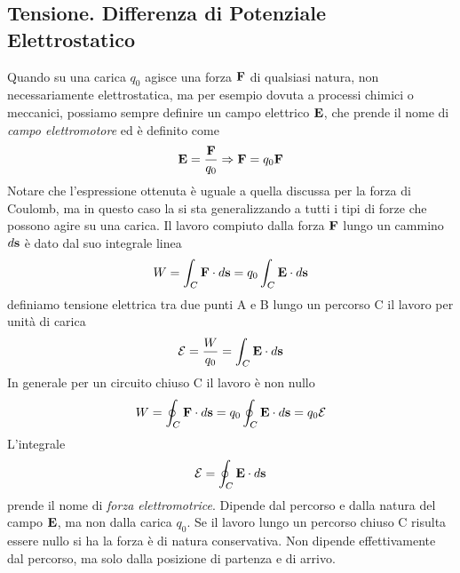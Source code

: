 \subsection{Tensione. Differenza di Potenziale Elettrostatico}
Quando su una carica $q_0$ agisce una forza $\bold{F}$ di qualsiasi natura, non necessariamente elettrostatica, ma per esempio dovuta a processi chimici o meccanici, possiamo sempre definire un campo elettrico $\bold{E}$, che prende il nome di \textit{campo elettromotore} ed \`e definito come
\begin{equation*}
	\bold{E} =  \frac{\bold{F}}{q_0} \Rightarrow \bold{F} = q_0 \bold{F}
\end{equation*}
 Notare che l'espressione ottenuta \`e uguale a quella discussa per la forza di Coulomb, ma in questo caso la si sta generalizzando a tutti i tipi di forze che possono agire su una carica. Il lavoro compiuto dalla forza $\bold{F}$ lungo un cammino $d \bold{s}$ \`e dato dal suo integrale linea 
 \begin{equation*}
 	W = \int_{C} \bold{F} \cdot d\bold{s} = q_0 \int_{C} \bold{E} \cdot d\bold{s}
 \end{equation*}
definiamo tensione elettrica tra due punti A e B lungo un percorso C il lavoro per unit\`a di carica  
\begin{equation*}
	\mathcal{E} = \frac{W}{q_0} = \int_{C}\bold{E} \cdot d\bold{s}
\end{equation*}
 In generale per un circuito chiuso C il lavoro \`e non nullo
\begin{equation*}
	W = \oint_{C} \bold{F} \cdot d\bold{s} = q_0 \oint_{C} \bold{E} \cdot d\bold{s} = q_0 \mathcal{E}
\end{equation*} 
L'integrale 
\begin{equation*}
	\mathcal{E} = \oint_{C} \bold{E} \cdot d \bold{s}
\end{equation*}
prende il nome di \textit{forza elettromotrice}. Dipende dal percorso e dalla natura del campo $\bold{E}$, ma non dalla carica $q_0$. Se il lavoro lungo un percorso chiuso C risulta essere nullo si ha la forza \`e di natura conservativa. Non dipende effettivamente dal percorso, ma solo dalla posizione di partenza e di arrivo.
\\


